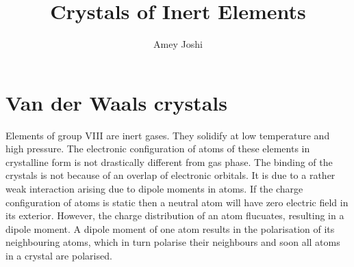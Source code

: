 \documentclass{article}
\title{Crystals of Inert Elements}
\begin{document}
\author{Amey Joshi}
\maketitle
\section{Van der Waals crystals}\label{s1}
Elements of group VIII are inert gases. They solidify at low temperature and
high pressure. The electronic configuration of atoms of these elements in 
crystalline form is not drastically different from gas phase. The binding of
the crystals is not because of an overlap of electronic orbitals. It is due to
a rather weak interaction arising due to dipole moments in atoms. If the charge
configuration of atoms is static then a neutral atom will have zero electric
field in its exterior. However, the charge distribution of an atom flucuates,
resulting in a dipole moment. A dipole moment of one atom results in the 
polarisation of its neighbouring atoms, which in turn polarise their neighbours
and soon all atoms in a crystal are polarised. 
\end{document}
